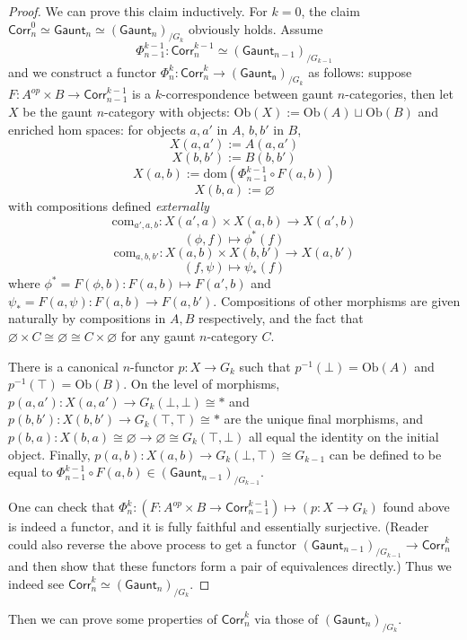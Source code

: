 \documentclass{article}
\theoremstyle{definition}
\theoremstyle{remark}
\begin{document}
\begin{proof}
We can prove this claim inductively. For $k=0$, the claim $\mathsf{Corr}^0_n \simeq \mathsf{Gaunt}_n \simeq (\mathsf{Gaunt}_n)_{/G_k}$ obviously holds. Assume $$\Phi^{k-1}_{n-1}:\mathsf{Corr}^{k-1}_n \simeq (\mathsf{Gaunt}_{n-1})_{/G_{k-1}}$$ and we construct a functor $\Phi^k_n:\mathsf{Corr}^k_n \to (\mathsf{Gaunt_n})_{/G_k}$ as follows: suppose $F:A^{op} \times B \to \mathsf{Corr}^{k-1}_{n-1}$ is a $k$-correspondence between gaunt $n$-categories, then let $X$ be the gaunt $n$-category with objects: $\mathrm{Ob}(X):=\mathrm{Ob}(A) \sqcup \mathrm{Ob}(B)$ and enriched hom spaces: for objects $a,a'$ in $A$, $b,b'$ in $B$, $$ X(a,a'):=A(a,a') $$    $$X(b,b'):= B(b,b')$$    $$X(a,b):=\mathrm{dom}(\Phi^{k-1}_{n-1} \circ F(a,b))$$    $$X(b,a):=\varnothing$$ with compositions defined \textit{externally} $$ \mathrm{com}_{a',a,b}: X(a',a) \times X(a,b) \to X(a',b) $$    $$ (\phi,f) \mapsto \phi^*(f) $$    $$ \mathrm{com}_{a,b,b'}: X(a,b) \times X(b,b') \to X(a,b') $$    $$ (f,\psi) \mapsto \psi_*(f) $$ where $\phi^*=F(\phi,b):F(a,b) \mapsto F(a',b)$ and $\psi_*=F(a,\psi):F(a,b) \to F(a,b')$. Compositions of other morphisms are given naturally by compositions in $A,B$ respectively, and the fact that $\varnothing \times C \cong \varnothing \cong C \times \varnothing$ for any gaunt $n$-category $C$.

There is a canonical $n$-functor $p:X \to G_k$ such that $ p^{-1}(\bot)=\mathrm{Ob}(A)$ and $ p^{-1}(\top)=\mathrm{Ob}(B) $. On the level of morphisms, $p(a,a'): X(a,a') \to G_k(\bot,\bot) \cong *$ and $p(b,b'):X(b,b') \to G_k(\top,\top) \cong *$ are the unique final morphisms, and $p(b,a):X(b,a) \cong \varnothing \to \varnothing \cong G_k(\top,\bot)$ all equal the identity on the initial object. Finally, $p(a,b):X(a,b) \to G_k(\bot,\top) \cong G_{k-1}$ can be defined to be equal to $\Phi^{k-1}_{n-1} \circ F(a,b) \in (\mathsf{Gaunt}_{n-1})_{/G_{k-1}}$.

One can check that $\Phi^k_n: (F:A^{op} \times B \to \mathsf{Corr}^{k-1}_{n-1}) \mapsto (p:X \to G_k)$ found above is indeed a functor, and it is fully faithful and essentially surjective. (Reader could also reverse the above process to get a functor $(\mathsf{Gaunt}_{n-1})_{/G_{k-1}} \to \mathsf{Corr}^k_n $ and then show that these functors form a pair of equivalences directly.) Thus we indeed see $\mathsf{Corr}^k_n \simeq (\mathsf{Gaunt}_n)_{/G_k}$.
\end{proof}

Then we can prove some properties of $\mathsf{Corr}^k_n$ via those of $(\mathsf{Gaunt}_n)_{/G_k}$.
\end{document}
